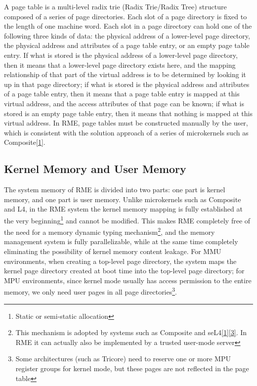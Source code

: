 A page table is a multi-level radix trie (Radix Trie/Radix
Tree) structure composed of a series of page directories. Each slot of a page directory is fixed to the length of one machine word. Each slot in a page directory can hold one of the following three kinds of data: the physical address of a lower-level page directory, the physical address and attributes of a page table entry, or an empty page table entry. If what is stored is the physical address of a lower-level page directory, then it means that a lower-level page directory exists here, and the mapping relationship of that part of the virtual address is to be determined by looking it up in that page directory; if what is stored is the physical address and attributes of a page table entry, then it means that a page table entry is mapped at this virtual address, and the access attributes of that page can be known; if what is stored is an empty page table entry, then it means that nothing is mapped at this virtual address. In RME, page tables must be constructed manually by the user, which is consistent with the solution approach of a series of microkernels such as Composite\hyperref[cite:3-1]{{[}1{]}}.

\subsection{Kernel Memory and User Memory}\label{subsec:3-kernel-memory-and-user-memory}

The system memory of RME is divided into two parts: one part is kernel memory, and one part is user memory. Unlike microkernels such as Composite and L4, in the RME system the kernel memory mapping is fully established at the very beginning\footnote{Static or semi-static allocation} and cannot be modified. This makes RME completely free of the need for a memory dynamic typing mechanism\footnote{This mechanism is adopted by systems such as Composite and seL4\hyperref[cite:3-1]{{[}1{]}}\hyperref[cite:3-3]{{[}3{]}}. In RME it can actually also be implemented by a trusted user-mode server}, and the memory management system is fully parallelizable, while at the same time completely eliminating the possibility of kernel memory content leakage. For MMU environments, when creating a top-level page directory, the system maps the kernel page directory created at boot time into the top-level page directory; for MPU environments, since kernel mode usually has access permission to the entire memory, we only need user pages in all page directories\footnote{Some architectures (such as Tricore) need to reserve one or more MPU register groups for kernel mode, but these pages are not reflected in the page table}.

